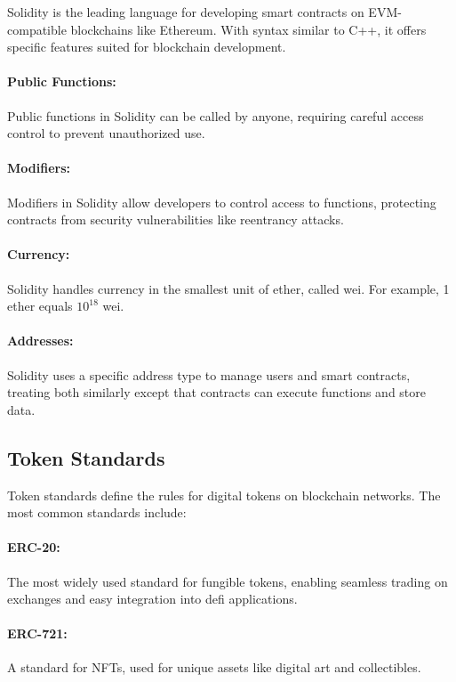 Solidity is the leading language for developing smart contracts on
EVM-compatible blockchains like Ethereum. With syntax similar to C++, it offers
specific features suited for blockchain development.

\paragraph{Public Functions:}
Public functions in Solidity can be called by anyone, requiring careful access
control to prevent unauthorized use.

\paragraph{Modifiers:}
Modifiers in Solidity allow developers to control access to functions,
protecting contracts from security vulnerabilities like reentrancy attacks.

\paragraph{Currency:}
Solidity handles currency in the smallest unit of ether, called wei. For
example, 1 ether equals $10^{18}$ wei.

\paragraph{Addresses:}
Solidity uses a specific address type to manage users and smart contracts,
treating both similarly except that contracts can execute functions and store
data.

\subsection{Token Standards}\label{subsec:token_standards}

Token standards define the rules for digital tokens on blockchain networks. The
most common standards include:

\paragraph{ERC-20:}
The most widely used standard for fungible tokens, enabling seamless trading on
exchanges and easy integration into \gls{defi} applications.

\paragraph{ERC-721:}
A standard for NFTs, used for unique assets like digital art and collectibles.


